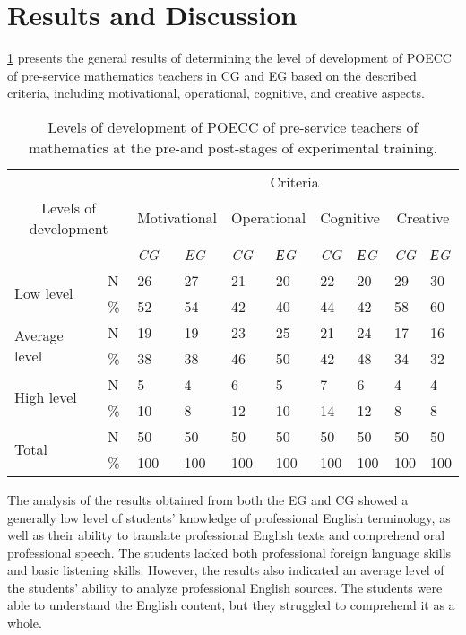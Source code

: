 \section{Results and Discussion}\label{sec-results}

\cref{tab-03} presents the general results of determining the level of
development of POECC of pre-service mathematics teachers in CG and EG
based on the described criteria, including motivational, operational,
cognitive, and creative aspects.

\begin{table}[!htpb]
\centering
\begin{threeparttable}
\caption{Levels of development of POECC of pre-service teachers of mathematics at the pre-and post-stages of experimental training.}
\label{tab-03}
\begin{tabular}{ l l l l l l l l l l}
\toprule		
 &  & \multicolumn{8}{c}{Criteria}\\
\multicolumn{2}{c}{Levels of development} & \multicolumn{2}{c}{Motivational} & \multicolumn{2}{c}{Operational} & \multicolumn{2}{c}{Cognitive} & \multicolumn{2}{c}{Creative} \\
 & & \emph{CG} & \emph{EG} & \emph{CG} & \emph{ЕG} & \emph{CG} & \emph{ЕG} & \emph{CG} & \emph{ЕG} \\
\midrule
\multirow{2}{*}{Low level} & N & 26 & 27 & 21 & 20 & 22 & 20 & 29 & 30 \\
 & \% & 52 & 54 & 42 & 40 & 44 & 42 & 58 & 60 \\
\cmidrule{2-10}
\multirow{2}{*}{Average level} & N & 19 & 19 & 23 & 25 & 21 & 24 & 17 & 16 \\
 & \% & 38 & 38 & 46 & 50 & 42 & 48 & 34 & 32 \\
\cmidrule{2-10}
\multirow{2}{*}{High level} & N & 5 & 4 & 6 & 5 & 7 & 6 & 4 & 4 \\
 & \% & 10 & 8 & 12 & 10 & 14 & 12 & 8 & 8 \\
\cmidrule{2-10}
\multirow{2}{*}{Total} & N & 50 & 50 & 50 & 50 & 50 & 50 & 50 & 50 \\
 & \% & 100 & 100 & 100 & 100 & 100 & 100 & 100 & 100  \\
\bottomrule
\end{tabular}
\end{threeparttable}
\end{table}

The analysis of the results obtained from both the EG and CG showed a
generally low level of students' knowledge of professional English
terminology, as well as their ability to translate professional English
texts and comprehend oral professional speech. The students lacked both
professional foreign language skills and basic listening skills.
However, the results also indicated an average level of the students'
ability to analyze professional English sources. The students were able
to understand the English content, but they struggled to comprehend it
as a whole.

